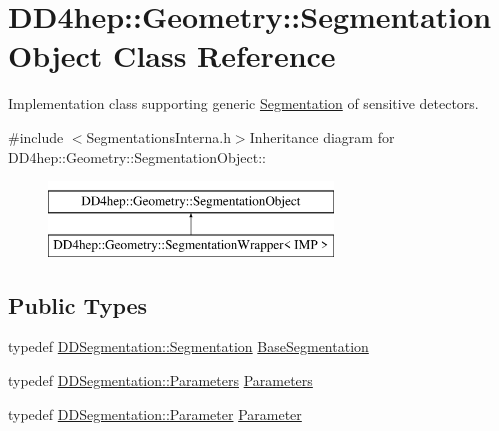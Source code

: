 \hypertarget{class_d_d4hep_1_1_geometry_1_1_segmentation_object}{
\section{DD4hep::Geometry::SegmentationObject Class Reference}
\label{class_d_d4hep_1_1_geometry_1_1_segmentation_object}
}


Implementation class supporting generic \hyperlink{class_d_d4hep_1_1_geometry_1_1_segmentation}{Segmentation} of sensitive detectors.  


{\ttfamily \#include $<$SegmentationsInterna.h$>$}Inheritance diagram for DD4hep::Geometry::SegmentationObject::\begin{figure}[H]
\begin{center}
\leavevmode
\includegraphics[height=2cm]{class_d_d4hep_1_1_geometry_1_1_segmentation_object}
\end{center}
\end{figure}
\subsection*{Public Types}
\begin{DoxyCompactItemize}
\item 
typedef \hyperlink{class_d_d4hep_1_1_d_d_segmentation_1_1_segmentation}{DDSegmentation::Segmentation} \hyperlink{class_d_d4hep_1_1_geometry_1_1_segmentation_object_a57ca8eb515f079fdc61916df50468818}{BaseSegmentation}
\item 
typedef \hyperlink{namespace_d_d4hep_1_1_d_d_segmentation_af38026430ca0e1ef64acdfc898f5dd3d}{DDSegmentation::Parameters} \hyperlink{class_d_d4hep_1_1_geometry_1_1_segmentation_object_adb4bb039e0cd15ea9fbe0232d07c49cc}{Parameters}
\item 
typedef \hyperlink{class_d_d4hep_1_1_d_d_segmentation_1_1_segmentation_parameter}{DDSegmentation::Parameter} \hyperlink{class_d_d4hep_1_1_geometry_1_1_segmentation_object_a0d017ffe7385b6fe44bf411386cc672b}{Parameter}
\end{DoxyCompactItemize}
